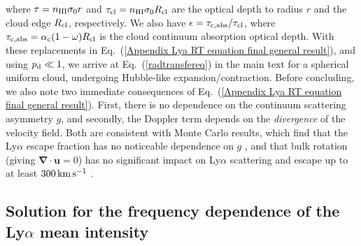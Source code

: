 \documentclass[fleqn,usenatbib]{mnras}
\newcommand{\taucl}{\tau_{\rm cl}}
\begin{document}
where $\tau = n_{\rm HI} \sigma_0 r$ and $\taucl =  n_{\rm HI} \sigma_0 R_{\rm cl}$ are the optical depth to radius $r$ and the cloud edge $R_{\rm cl}$, respectively. We also have $\epsilon = \tau_{\rm c,abs}/\taucl$, where $\tau_{\rm c,abs} = \alpha_{\rm c} (1 - \omega) R_{\rm cl}$ is the cloud continuum absorption optical depth. With these replacements in Eq.~(\ref{Appendix Lya RT equation final general result}), and using $p_{\rm d} \ll 1$, we arrive at Eq.~(\ref{radtransfereq}) in the main text for a spherical uniform cloud, undergoing Hubble-like expansion/contraction. Before concluding, we also note two immediate consequences of Eq.~(\ref{Appendix Lya RT equation final general result}). First, there is no dependence on the continuum scattering asymmetry $g$, and secondly, the Doppler term depends on the \textit{divergence} of the velocity field. Both are consistent with Monte Carlo results, which find that the Ly$\alpha$ escape fraction has no noticeable dependence on $g$ \citep{Laursen2009}, and that bulk rotation (giving $\boldsymbol{\nabla \cdot u}=0$) has no significant impact on Ly$\alpha$ scattering and escape up to at least $300 \rm \, km \, s^{-1}$ \citep{Garavito2014}.

\subsection{Solution for the frequency dependence of the Ly\texorpdfstring{\boldmath$\alpha$}{alpha} mean intensity}
\label{AppendixRTfreq}
\end{document}
